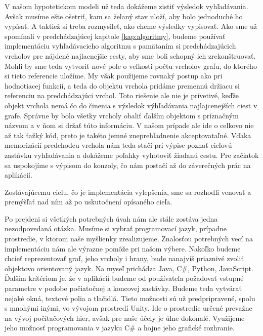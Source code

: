 V našom hypotetickom modeli už teda dokážeme zistiť výsledok vyhľadávania. Avšak musíme ešte ošetriť, kam sa želaný stav uloží, aby bolo jednoduché ho vypísať. A taktiež si treba rozmysileť, ako cheme výsledky vypisovať. Ako sme už spomínali v predchádzajúcej kapitole \ref{kap:algoritmy}, budeme používať implementáciu vyhľadávacieho algoritmu s pamätaním si predchádzajúcich vrcholov pre nájdené najlacnejšie cesty, aby sme boli schopný ich zrekonštruovať. Mohli by sme teda vytvoriť nové pole o veľkosti počtu vrcholov grafu, do ktorého si tieto referencie uložíme. My však použijeme rovnaký postup ako pri hodnotiacej funkcií, a teda do objektu vrchola pridáme premennú držiacu si referenciu na predchádzajúci vrchol. Toto riešenie ale nie je prívetivé, keďže objekt vrchola nemá čo do činenia s výsledok výhľadávania najlajcenejších ciest v grafe. Správne by bolo všetky vrcholy obaliť ďalším objektom s príznačným názvom a v ňom si držať túto informáciu. V našom prípade ale ide o celkovo nie až tak ťažký kód, preto je takéto jemné zneprehľadnenie akceptovataľné. Vďaka memorizácií predchodcu vrchola nám teda stačí pri výpise poznať cieľovú zastávku vyhľadávania a dokážeme poľahky vyhotoviť žiadanú cestu. Pre začiatok sa uspokojíme s výpisom do konzoly, čo nám postačí až do záverečných prác na aplikácií.\newline

Zostávajúcemu cieľu, čo je implementácia vylepšenia, sme sa rozhodli venovať a premýšľať nad ním až po uskutočnení opísaného cieľa.\newline

Po prejdeni si všetkých potrebných úvah nám ale stále zostáva jedna nezodpovedaná otázka. Musíme si vybrať programovací jazyk, prípadne prostredie, v ktorom naše myšlienky zrealizujeme. Znalosťou potrebných vecí na implementáciu nám ale výrazne pomôže pri našom výbere. Nakoľko budeme chcieť reprezentovať graf, jeho vrcholy i hrany, bude nanajvíš priaznivé zvoliť objektovo orientovaný jazyk. Na myseľ prichádza Java, C\#, Python, JavaScript. Ďalšim krítériom je, že v aplikácií budeme od používateľa požadovať vstupné parametre v podobe počiatočnej a koncovej zastávky. Budeme teda vytvárať nejaké okná, textové polia a tlačidlá. Tieto možnosti sú už predpripravené, spolu s mnohými inými, vo vývojom prostredí Unity. Ide o prostredie určené prevažne na vývoj počítačových hier, avšak pre naše účely je úlne dokonalé. Využijeme jeho možnosť programovania v jazyku C\# a hojne jeho grafické rozhranie.\newline


